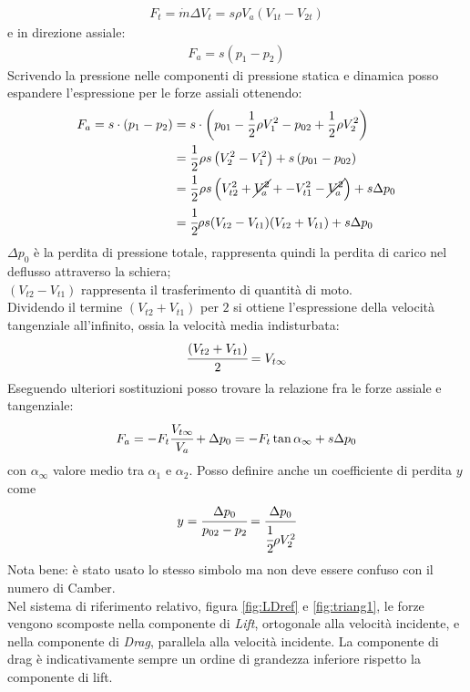 \begin{align*}
F_t= \dot{m} \Delta V_t = s \rho	V_a (V_{1t}-V_{2t})
\end{align*}
e in direzione assiale:
\begin{align*}
F_a = s (p_1 - p_2)
\end{align*}
Scrivendo la pressione nelle componenti di pressione statica e dinamica posso espandere l'espressione per le forze assiali ottenendo:
\begin{align*}
F_a = s \cdot ( p_1 - p_2) &= s \cdot \left( p_{01} - \frac{1}{2} \rho V_1^2 - p_{02} + \frac{1}{2} \rho V_2^2 \right)\\
&= \frac{1}{2} \rho s \left( V_2^2 - V_1^2 \right) + s \left( p_{01} - p_{02} \right)\\
&= \frac{1}{2} \rho s \left( V_{t2}^2 + \cancel{V_a^2} + - V_{t1}^2- \cancel{V_a^2} \right) + s \Delta p_0\\
&=\cfrac{1}{2} \rho s (V_{t2}-V_{t1}) (V_{t2}+V_{t1}) + s \Delta p_0
\end{align*}
$\Delta p_0$ è la perdita di pressione totale, rappresenta quindi la perdita di carico nel deflusso attraverso la schiera; \\
$(V_{t2}-V_{t1})$ rappresenta il trasferimento di quantità di moto. \\
Dividendo il termine $(V_{t2}+V_{t1})$ per $2$ si ottiene l'espressione della velocità tangenziale all'infinito, ossia la velocità media indisturbata:
\begin{align*}
\cfrac{(V_{t2}+V_{t1})}{2} = V_{t \infty}
\end{align*}
Eseguendo ulteriori sostituzioni posso trovare la relazione fra le forze assiale e tangenziale:
\begin{align*}
F_a = -F_t \cfrac{V_{t \infty}}{V_a} + \Delta p_0 = - F_t \tan \alpha_{\infty} + s \Delta p_0
\end{align*}
con $\alpha_{\infty}$ valore medio tra $\alpha_1$ e $\alpha_2$. Posso definire anche un coefficiente di perdita $y$ come
\begin{align*}
y = \cfrac{\Delta p_0}{p_{02}-p_2} = \cfrac{\Delta p_0}{\cfrac{1}{2} \rho V_2^2}
\end{align*}
Nota bene: è stato usato lo stesso simbolo ma non deve essere confuso con il numero di Camber.\\
Nel sistema di riferimento relativo, figura \ref{fig:LDref} e \ref{fig:triang1}, le forze vengono scomposte nella componente di \textit{Lift}, ortogonale alla velocità incidente, e nella componente di \textit{Drag}, parallela alla velocità incidente. La componente di drag è indicativamente sempre un ordine di grandezza inferiore rispetto la componente di lift.
